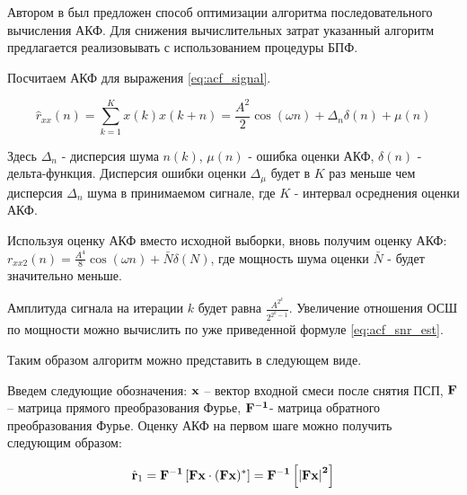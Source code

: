 Автором в \cite{my_acf} был предложен способ оптимизации алгоритма последовательного вычисления АКФ.
Для снижения вычислительных затрат указанный алгоритм предлагается реализовывать с использованием процедуры БПФ. 

Посчитаем АКФ для выражения \ref{eq:acf_signal}.
\begin{center}
\begin{equation}
	\label{eq:lpc_akf_n}
	\hat{r}_{xx}(n) = \sum \limits_{k=1}^{K} x(k)x(k+n) = \frac{A^2}{2} \cos{(\omega{n})} + \Delta_n \delta{(n)} + \mu{(n)}
\end{equation}
\end{center}

Здесь ${\Delta_n}$ - дисперсия шума ${n(k)}$, ${\mu{(n)}}$ - ошибка оценки АКФ, ${\delta{(n)}}$ - дельта-функция. Дисперсия ошибки
оценки ${\Delta_{\mu}}$ будет в ${K}$ раз меньше чем дисперсия ${\Delta_n}$ шума в принимаемом сигнале, где ${K}$ - интервал
осреднения оценки АКФ.

Используя оценку АКФ вместо исходной выборки, вновь получим оценку АКФ:
${r_{xx2}(n) = \frac{A^4}{8} \cos{(\omega n)} + \bar{N} \delta{(N)}}$,
где мощность шума оценки ${\bar{N}}$ - будет значительно меньше.

Амплитуда сигнала на итерации ${k}$ будет равна ${\frac{A^{2^k}}{2^{2^k-1}}}$. Увеличение отношения ОСШ по мощности можно
вычислить по уже приведенной формуле \ref{eq:acf_snr_est}. 

Таким образом алгоритм можно представить в следующем виде.

Введем следующие обозначения: ${\bf{x}}$ – вектор входной смеси после снятия ПСП, ${\bf{F}}$ – матрица прямого преобразования Фурье,
${\bf{F}^{-1}}$- матрица обратного преобразования Фурье.  Оценку АКФ на первом шаге можно получить следующим образом:

\begin{center}
\begin{equation}
	\label{eq:akf_1}
	\hat{\bf{r}}_1 = \bf{F}^{-1}\left[ \bf{Fx} \cdot (\bf{Fx})^* \right] = \bf{F}^{-1} \left[ \left| \bf{Fx} \right| ^2 \right]
\end{equation}
\end{center}

